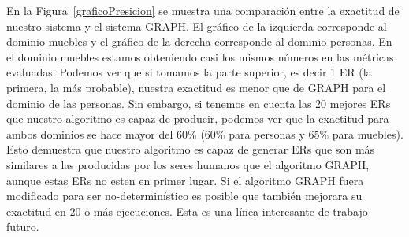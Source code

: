 \begin{table}[H]
En la Figura~\ref{graficoPresicion} se muestra una comparaci\'on entre la exactitud de nuestro sistema y el sistema GRAPH. El gr\'afico de la izquierda corresponde al dominio muebles y el gr\'afico de la derecha corresponde al dominio personas. En el dominio muebles estamos obteniendo casi los mismos n\'umeros en las m\'etricas evaluadas.
Podemos ver que si tomamos la parte superior, es decir 1 ER (la primera, la m\'as probable), nuestra exactitud es menor que de GRAPH para el dominio de las personas. Sin embargo, si tenemos en cuenta las 20 mejores ERs que nuestro algoritmo es capaz de producir, podemos ver que la exactitud para ambos dominios se hace mayor del 60\% (60\% para personas y 65\% para muebles). Esto demuestra que nuestro algoritmo es capaz de generar ERs que son m\'as similares a las producidas por los seres humanos que el algoritmo GRAPH, aunque estas ERs no esten en primer lugar. Si el algoritmo GRAPH fuera modificado para ser no-determin\'istico es posible que tambi\'en mejorara su exactitud en 20 o m\'as ejecuciones. Esta es una l\'inea interesante de trabajo futuro. 


\end{table}
